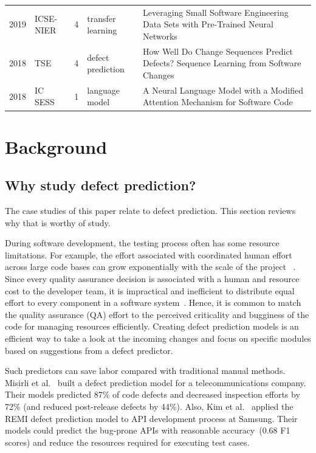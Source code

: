 \documentclass[10pt,compsoc,twocolumn]{IEEEtran}
\begin{document}
\begin{table}[t!]
{\begin{tabularx}{\textwidth}{llrlL}
	2019 & ICSE-NIER & 4 & transfer learning & Leveraging Small Software Engineering Data Sets with Pre-Trained Neural Networks \cite{robbes2019leveraging} \\
	2018 & TSE & 4 & defect prediction & How Well Do Change Sequences Predict Defects? Sequence Learning from Software Changes \cite{wen2018well} \\ 
	2018 & IC SESS & 1 & language model & A Neural Language Model with a Modified Attention Mechanism for Software Code \cite{zhang2018neural} \\
 \bottomrule  
\end{tabularx}
}
\end{table}

\section{Background}
\label{sec:background}

\subsection{Why study defect prediction?}
The case studies
of this paper relate to defect prediction.
This section
reviews why that is worthy of study.


During software development, the testing process  often has some resource limitations.
For example, the effort associated with coordinated human effort across large code bases can grow exponentially with the scale of the project ~\cite{fu2016tuning}.
Since every quality assurance decision is associated with a human and resource cost to the developer team, it is impractical and inefficient to distribute equal effort to every component in a software system~\cite{briand1993developing}.
Hence, 
it is common to match the quality assurance (QA) effort to the perceived criticality and bugginess of the code for managing resources efficiently. 
 Creating defect prediction models is an efficient way to take a look at the incoming changes and focus on specific modules based on suggestions from a defect predictor.  

Such predictors can save labor compared with traditional manual methods.
Misirli et al.~\cite{misirli2011ai} built a defect prediction model for a telecommunications company. Their models predicted 87\% of code defects and decreased inspection efforts by 72\% (and reduced post-release defects by 44\%). 
Also,
Kim et al.~\cite{kim2015remi} applied the REMI
defect prediction model to   API development process at Samsung.
Their models could
predict the bug-prone APIs with reasonable accuracy~(0.68 F1 scores) and reduce the resources required for executing test cases. 
\end{document}
